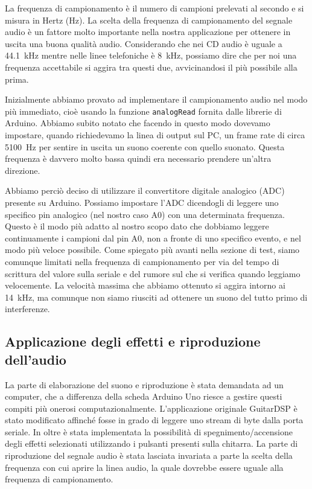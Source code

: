 \documentclass[a4paper,11pt]{article}
\begin{document}
La frequenza di campionamento è il numero di campioni prelevati al secondo e si misura in Hertz (\si{\hertz}).
La scelta della frequenza di campionamento del segnale audio è un fattore molto importante nella nostra applicazione per ottenere in uscita una buona qualità audio. Considerando che nei CD audio è uguale a \SI{44.1}{\kilo\hertz} mentre nelle linee telefoniche è \SI{8}{\kilo\hertz}, possiamo dire che per noi una frequenza accettabile si aggira tra questi due, avvicinandosi il più possibile alla prima.

Inizialmente abbiamo provato ad implementare il campionamento audio nel modo più immediato, cioè usando la funzione \texttt{analogRead} fornita dalle librerie di Arduino.
Abbiamo subito notato che facendo in questo modo dovevamo impostare, quando richiedevamo la linea di output sul PC, un frame rate di circa \SI{5100}{\hertz} per sentire in uscita un suono coerente con quello suonato. Questa frequenza è davvero molto bassa quindi era necessario prendere un'altra direzione.

Abbiamo perciò deciso di utilizzare il convertitore digitale analogico (ADC) presente su Arduino. Possiamo impostare l'ADC dicendogli di leggere uno specifico pin analogico (nel nostro caso A0) con una determinata frequenza. Questo è il modo più adatto al nostro scopo dato che dobbiamo leggere continuamente i campioni dal pin A0, non a fronte di uno specifico evento, e nel modo più veloce possibile.
Come spiegato più avanti nella sezione di test, siamo comunque limitati nella frequenza di campionamento per via del tempo di scrittura del valore sulla seriale e del rumore sul che si verifica quando leggiamo velocemente. La velocità massima che abbiamo ottenuto si aggira intorno ai \SI{14}{\kilo\hertz}, ma comunque non siamo riusciti ad ottenere un suono del tutto primo di interferenze.

\subsection{Applicazione degli effetti e riproduzione dell'audio}
La parte di elaborazione del suono e riproduzione è stata demandata ad un computer, che a differenza della scheda Arduino Uno riesce a gestire questi compiti più onerosi computazionalmente. L'applicazione originale GuitarDSP è stato modificato affinché fosse in grado di leggere uno stream di byte dalla porta seriale. In oltre è stata implementata la possibilità di spegnimento/accensione degli effetti selezionati utilizzando i pulsanti presenti sulla chitarra. La parte di riproduzione del segnale audio è stata lasciata invariata a parte la scelta della frequenza con cui aprire la linea audio, la quale dovrebbe essere uguale alla frequenza di campionamento.
\end{document}
